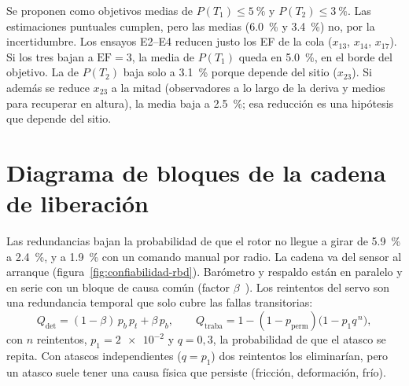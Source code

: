 \begin{resultado}
Se proponen como objetivos medias de $P(T_1)\le\SI{5}{\percent}$ y
$P(T_2)\le\SI{3}{\percent}$. Las estimaciones puntuales cumplen, pero las medias
(\SI{6.0}{\percent} y \SI{3.4}{\percent}) no, por la incertidumbre. Los ensayos E2--E4
reducen justo los EF de la cola ($x_{13}$, $x_{14}$, $x_{17}$). Si los tres bajan a
$\mathrm{EF}=3$, la media de $P(T_1)$ queda en \SI{5.0}{\percent}, en el borde del objetivo. La de $P(T_2)$ baja solo
a \SI{3.1}{\percent} porque depende del sitio ($x_{23}$). Si además se reduce $x_{23}$ a
la mitad (observadores a lo largo de la deriva y medios para recuperar en altura), la
media baja a \SI{2.5}{\percent}; esa reducción es una hipótesis que depende del sitio.
\end{resultado}

\section{Diagrama de bloques de la cadena de liberación}\label{sec:confiabilidad-rbd}
Las redundancias bajan la probabilidad de que el rotor no llegue a girar de
\SI{5.9}{\percent} a \SI{2.4}{\percent}, y a \SI{1.9}{\percent} con un comando manual por
radio. La cadena va del sensor al arranque (figura~\ref{fig:confiabilidad-rbd}).
Barómetro y respaldo están en paralelo y en serie con un bloque de causa común (factor
$\beta$~\cite{confiabilidad-rausand2004}). Los reintentos del servo son una redundancia
temporal que solo cubre las fallas transitorias:
\begin{equation}
  Q_{\mathrm{det}}=(1-\beta)\,p_b\,p_t+\beta\,p_b,\qquad
  Q_{\mathrm{traba}}=1-(1-p_{\mathrm{perm}})\bigl(1-p_1q^{\,n}\bigr),
  \label{eq:confiabilidad-reint}
\end{equation}
con $n$ reintentos, $p_1=\num{2e-2}$ y $q=0{,}3$, la probabilidad de que el atasco se
repita. Con atascos independientes ($q=p_1$) dos reintentos los eliminarían, pero un
atasco suele tener una causa física que persiste (fricción, deformación, frío).

